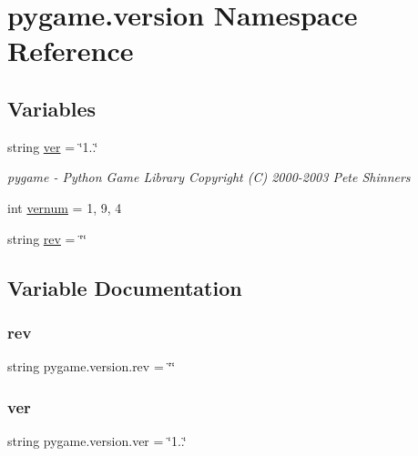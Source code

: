 \hypertarget{namespacepygame_1_1version}{}\section{pygame.\+version Namespace Reference}
\label{namespacepygame_1_1version}
\subsection*{Variables}
\begin{DoxyCompactItemize}
\item 
string \hyperlink{namespacepygame_1_1version_adedde44958db35706a28e2b60ca40d5d}{ver} = \char`\"{}1..\char`\"{}
\begin{DoxyCompactList}\small\item\em pygame -\/ Python Game Library Copyright (C) 2000-\/2003 Pete Shinners \end{DoxyCompactList}\item 
int \hyperlink{namespacepygame_1_1version_a75b9362c07f0bb99872231dfc6ebef03}{vernum} = 1, 9, 4
\item 
string \hyperlink{namespacepygame_1_1version_a8f31c53b3984d509a27011e2d4bf151c}{rev} = \char`\"{}\char`\"{}
\end{DoxyCompactItemize}


\subsection{Variable Documentation}
\mbox{\label{namespacepygame_1_1version_a8f31c53b3984d509a27011e2d4bf151c}} 
\subsubsection{\texorpdfstring{rev}{rev}}
{\footnotesize\ttfamily string pygame.\+version.\+rev = \char`\"{}\char`\"{}}

\mbox{\label{namespacepygame_1_1version_adedde44958db35706a28e2b60ca40d5d}} 
\subsubsection{\texorpdfstring{ver}{ver}}
{\footnotesize\ttfamily string pygame.\+version.\+ver = \char`\"{}1..\char`\"{}}



